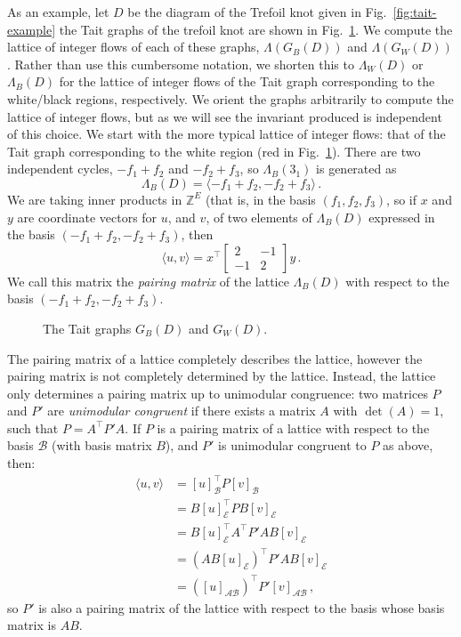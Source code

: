 \documentclass[12pt]{report}
\newcommand{\Z}{\mathbb{Z}}
\begin{document}
As an example, let $D$ be the diagram of the Trefoil knot given in Fig.~\ref{fig:tait-example} the Tait graphs of the trefoil knot   are shown in Fig.~\ref{fig:trefoil-abstract-tait}. We compute the lattice of integer flows of each of these graphs, $\Lambda(G_{B}(D))$ and $\Lambda(G_W(D))$. Rather than use this cumbersome notation, we shorten this to $\Lambda_{W}(D)$ or $\Lambda_{B}(D)$ for the lattice of integer flows of the Tait graph corresponding to the white/black regions, respectively. We orient the graphs arbitrarily to compute the lattice of integer flows, but as we will see the invariant produced is independent of this choice. We start with the more typical lattice of integer flows: that of the Tait graph corresponding to the white region (red in Fig.~\ref{fig:trefoil-abstract-tait}). There are two independent cycles, $-f_{1} + f_{2}$ and $-f_{2} + f_{3}$, so $\Lambda_{B}(3_{1})$ is generated as
\[\Lambda_{B}(D) = \langle -f_{1} + f_{2}, -f_{2} + f_{3} \rangle\,.\]
We are taking inner products in $\Z^{E}$ (that is, in the basis {$(f_{1}, f_{2}, f_{3})$}, so if $x$ and $y$ are coordinate vectors for $u$, and $v$, of two elements of $\Lambda_{B}(D)$ expressed in the basis $(-f_{1} + f_{2}, -f_{2} + f_{3})$, then
\[\langle u, v \rangle = x^{\top}\begin{bmatrix}
	2  & -1 \\
	-1 & 2
\end{bmatrix}y\,.\]
We call this matrix the \textit{pairing matrix} of the lattice $\Lambda_{B}(D)$ with respect to the basis ${(-f_{1} + f_{2}, -f_{2} + f_{3})}$.

\begin{figure}[hbt]
	\centering
	\def\svgscale{0.4}
	
	\caption{The Tait graphs $G_{B}(D)$ and $G_{W}(D)$.}
	\label{fig:trefoil-abstract-tait}
\end{figure}

The pairing matrix of a lattice completely describes the lattice, however the pairing matrix is not completely determined by the lattice. Instead, the lattice only determines a pairing matrix up to unimodular congruence: two matrices $P$ and $P'$ are \textit{unimodular congruent} if there exists a matrix $A$ with $\det(A) = 1$, such that $P = A^{\top}P'A$. If $P$ is a pairing matrix of a lattice with respect to the basis $\mathcal{B}$ (with basis matrix $B$), and $P'$ is unimodular congruent to $P$ as above, then:
\begin{align*}
	\langle u, v \rangle & = [u]_{\mathcal{B}}^{\top} P [v]_{\mathcal{B}}                    \\
	                     & = B[u]_{\mathcal{E}}^{\top} P B[v]_{\mathcal{E}}                  \\
	                     & = B[u]_{\mathcal{E}}^{\top} A^{\top} P' A B[v]_{\mathcal{E}}      \\
	                     & = \left( AB[u]_{\mathcal{E}} \right)^{\top} P' AB[v]_{\mathcal{E}} \\
	                     & = \left( [u]_{\mathcal{AB}} \right)^{\top} P' [v]_{\mathcal{AB}}\,,
\end{align*}
so $P'$ is also a pairing matrix of the lattice with respect to the basis whose basis matrix is $AB$.
\end{document}
